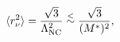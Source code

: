 \begin{equation}
\langle r^2_{\nu}\rangle =  \frac{\sqrt3}{\Lambda_{\rm NC}^2} \stackrel{<}{\sim} 
\frac{\sqrt3}{(M^*)^2},
\label{9}
\end{equation}


